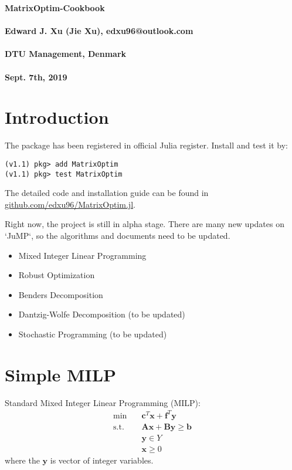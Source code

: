\documentclass[fleqn,10pt]{wlscirep}
\begin{document}
\flushbottom
{\noindent \LARGE \textbf{MatrixOptim-Cookbook}} \\
\\[-1em]
{\noindent \textbf{Edward J. Xu (Jie Xu), edxu96@outlook.com}} \\
\\[-1em]
{\noindent \textbf{DTU Management, Denmark}} \\
\\[-1em]
{\noindent \textbf{Sept. 7th, 2019}}


\section{Introduction}

The package has been registered in official Julia register. Install and test it by:

\begin{lstlisting}
(v1.1) pkg> add MatrixOptim
(v1.1) pkg> test MatrixOptim
\end{lstlisting}

The detailed code and installation guide can be found in \href{https://github.com/edxu96/MatrixOptim.jl}{github.com/edxu96/MatrixOptim.jl}.

Right now, the project is still in alpha stage. There are many new updates on `JuMP`, so the algorithms and documents need to be updated. 

\begin{itemize}
    \item Mixed Integer Linear Programming
    \item Robust Optimization
    \item Benders Decomposition
    \item Dantzig-Wolfe Decomposition (to be updated)
    \item Stochastic Programming (to be updated)
\end{itemize}

\section{Simple MILP}

Standard Mixed Integer Linear Programming (MILP):
\begin{align}
    \min \quad& \mathbf{c} ^ { T } \mathbf{x} + \mathbf{f} ^ { T } \mathbf{y} \label{eq:1} \\
    \text{s.t.} \quad& \mathbf{A} \mathbf{x} + \mathbf{B} \mathbf{y} \geq \mathbf{b} \label{eq:2} \\ 
    & \mathbf{y} \in Y \label{eq:3} \\ 
    & \mathbf{x} \geq 0 \label{eq:4} 
\end{align}
where the $\mathbf{y}$ is vector of integer variables.
\end{document}

